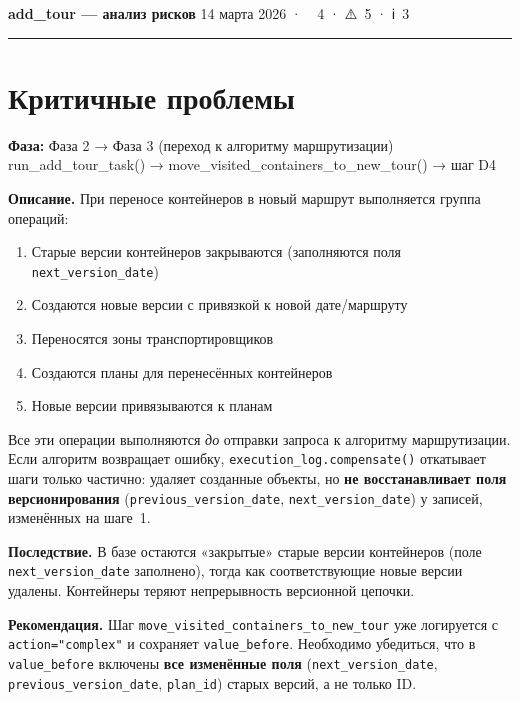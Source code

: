 \documentclass[11pt, a4paper, oneside]{article}
\newcommand{\coderef}[1]{{\footnotesize\color{MidGray}\ttfamily #1}}
\begin{document}
{\noindent\large\bfseries\sffamily\color{AccentBlue} add\_tour — анализ рисков}
\hfill{\small\color{MidGray} 14 марта 2026 · 🔴~4 · ⚠️~5 · ℹ️~3}
\vspace{1mm}
{\color{AccentBlue}\rule{\textwidth}{0.5pt}}
\vspace{4mm}

\section{Критичные проблемы}

\begin{critbox}[title={🔴 \#1 — Версионирование контейнеров не откатывается при сбое алгоритма}]

\textbf{Фаза:} Фаза 2 → Фаза 3 (переход к алгоритму маршрутизации)\\
\coderef{run\_add\_tour\_task() → move\_visited\_containers\_to\_new\_tour() → шаг D4}

\textbf{Описание.}
При переносе контейнеров в новый маршрут выполняется группа операций:
\begin{enumerate}
  \item Старые версии контейнеров закрываются (заполняются поля \texttt{next\_version\_date})
  \item Создаются новые версии с привязкой к новой дате/маршруту
  \item Переносятся зоны транспортировщиков
  \item Создаются планы для перенесённых контейнеров
  \item Новые версии привязываются к планам
\end{enumerate}
Все эти операции выполняются \emph{до} отправки запроса к алгоритму маршрутизации.
Если алгоритм возвращает ошибку, \texttt{execution\_log.compensate()}
откатывает шаги только частично: удаляет созданные объекты,
но \textbf{не восстанавливает поля версионирования}
(\texttt{previous\_version\_date}, \texttt{next\_version\_date})
у записей, изменённых на шаге~1.

\textbf{Последствие.} В базе остаются «закрытые» старые версии контейнеров
(поле \texttt{next\_version\_date} заполнено), тогда как соответствующие
новые версии удалены. Контейнеры теряют непрерывность версионной цепочки.

\textbf{Рекомендация.}
Шаг \texttt{move\_visited\_containers\_to\_new\_tour} уже логируется
с \texttt{action="complex"} и сохраняет \texttt{value\_before}.
Необходимо убедиться, что в \texttt{value\_before} включены
\textbf{все изменённые поля} (\texttt{next\_version\_date},
\texttt{previous\_version\_date}, \texttt{plan\_id})
старых версий, а не только ID.
\end{critbox}
\end{document}
